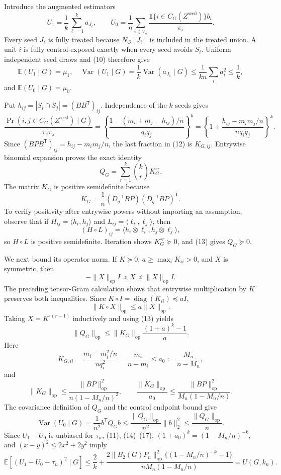 Introduce the augmented estimators
\[
U_1=\frac1k\sum_{\ell=1}^ka_{J_\ell},
\qquad
U_0=\frac1n\sum_{i\in V_n}\frac{\mathbf 1\{i\in C_G(Z^{\mathrm{seed}})\}b_i}{\pi_i}.
\]
Every seed \(J_\ell\) is fully treated because \(N_G[J_\ell]\) is included in the treated union.  A unit \(i\) is fully control-exposed exactly when every seed avoids \(S_i\).  Uniform independent seed draws and (10) therefore give
\[
\mathbb E(U_1\mid G)=\mu_1,
\quad
\operatorname{Var}(U_1\mid G)=\frac1k\operatorname{Var}(a_{J_1}\mid G)
\le\frac1{kn}\sum_i a_i^2\le\frac1k,
\tag{11}
\]
and \(\mathbb E(U_0\mid G)=\mu_0\).

Put \(h_{ij}=|S_i\cap S_j|=(BB^{\mathsf T})_{ij}\).  Independence of the \(k\) seeds gives
\[
\frac{\Pr(i,j\in C_G(Z^{\mathrm{seed}})\mid G)}{\pi_i\pi_j}
=\left\{\frac{1-(m_i+m_j-h_{ij})/n}{q_iq_j}\right\}^{k}
=\left\{1+\frac{h_{ij}-m_im_j/n}{nq_iq_j}\right\}^{k}.
\tag{12}
\]
Since \((BPB^{\mathsf T})_{ij}=h_{ij}-m_im_j/n\), the last fraction in (12) is \(K_{G,ij}\).  Entrywise binomial expansion proves the exact identity
\[
Q_G=\sum_{r=1}^{k}\binom{k}{r}K_G^{\circ r}.
\tag{13}
\]
The matrix \(K_G\) is positive semidefinite because
\[
K_G=\frac1n(D_q^{-1}BP)(D_q^{-1}BP)^{\mathsf T}.
\]
To verify positivity after entrywise powers without importing an assumption, observe that if \(H_{ij}=\langle h_i,h_j\rangle\) and \(L_{ij}=\langle \ell_i,\ell_j\rangle\), then
\[
(H\circ L)_{ij}=\langle h_i\otimes\ell_i,h_j\otimes\ell_j\rangle,
\]
so \(H\circ L\) is positive semidefinite.  Iteration shows \(K_G^{\circ r}\succeq0\), and (13) gives \(Q_G\succeq0\).

We next bound its operator norm.  If \(K\succeq0\), \(a\ge\max_iK_{ii}>0\), and \(X\) is symmetric, then
\[
-\|X\|_{\mathrm{op}}I\preceq X\preceq\|X\|_{\mathrm{op}}I.
\]
The preceding tensor-Gram calculation shows that entrywise multiplication by \(K\) preserves both inequalities.  Since \(K\circ I=\operatorname{diag}(K_{ii})\preceq aI\),
\[
\|K\circ X\|_{\mathrm{op}}\le a\|X\|_{\mathrm{op}}.
\]
Taking \(X=K^{\circ(r-1)}\) inductively and using (13) yields
\[
\|Q_G\|_{\mathrm{op}}
\le\|K_G\|_{\mathrm{op}}\frac{(1+a)^k-1}{a}.
\tag{14}
\]
Here
\[
K_{G,ii}=\frac{m_i-m_i^2/n}{nq_i^2}=\frac{m_i}{n-m_i}
\le a_0:=\frac{M_n}{n-M_n},
\tag{15}
\]
and
\[
\|K_G\|_{\mathrm{op}}
\le\frac{\|BP\|_{\mathrm{op}}^2}{n(1-M_n/n)^2},
\qquad
\frac{\|K_G\|_{\mathrm{op}}}{a_0}
\le\frac{\|BP\|_{\mathrm{op}}^2}{M_n(1-M_n/n)}.
\tag{16}
\]
The covariance definition of \(Q_G\) and the control endpoint bound give
\[
\operatorname{Var}(U_0\mid G)=\frac1{n^2}b^{\mathsf T}Q_Gb
\le\frac{\|Q_G\|_{\mathrm{op}}}{n^2}\|b\|_2^2
\le\frac{\|Q_G\|_{\mathrm{op}}}{n}.
\tag{17}
\]
Since \(U_1-U_0\) is unbiased for \(\tau_n\), (11), (14)--(17), \((1+a_0)^k=(1-M_n/n)^{-k}\), and \((x-y)^2\le2x^2+2y^2\) imply
\[
\mathbb E[(U_1-U_0-\tau_n)^2\mid G]
\le\frac2k+
\frac{2\|B_2(G)P_n\|_{\mathrm{op}}^2\{(1-M_n/n)^{-k}-1\}}
{nM_n(1-M_n/n)}
=U(G,k_n).
\tag{18}
\]

